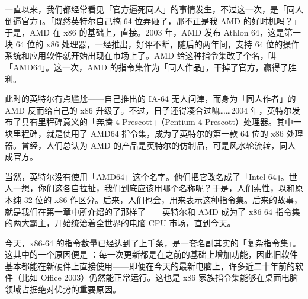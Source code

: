一直以来，我们都经常看见「官方逼死同人」的事情发生，不过这一次，是「同人倒逼官方」。「既然英特尔自己搞 64 位弄砸了，那不正是我 AMD 的好时机吗？」于是，AMD 在 x86 的基础上，直接。2003 年，AMD 发布 Athlon 64，这是第一块 64 位的 x86 处理器，一经推出，好评不断，随后的两年间，支持 64 位的操作系统和应用软件就开始出现在市场上了。AMD 给这种指令集改了个名，叫「AMD64」。这一次，AMD 的指令集作为「同人作品」，干掉了官方，赢得了胜利。

此时的英特尔有点尴尬——自己推出的 IA-64 无人问津，而身为「同人作者」的 AMD 反而给自己的 x86 升级了。不过，日子还得凑合过嘛……2004 年，英特尔发布了具有里程碑意义的「奔腾 4 Prescott」（Pentium 4 Prescott）处理器。其中一块里程碑，就是使用了 AMD64 指令集，成为了英特尔的第一款 64 位的 x86 处理器。曾经，人们总认为 AMD 的产品是英特尔的仿制品，可是风水轮流转，同人成官方。

当然，英特尔没有使用「AMD64」这个名字。他们把它改名成了「Intel 64」。世人一想，你们这各自拉扯，我们到底应该用哪个名称呢？于是，人们索性，以和原本纯 32 位的 x86 作区分。后来，人们也会，用来表示这种指令集。后来的故事，就是我们在第一章中所介绍的了那样了——英特尔和 AMD 成为了 x86-64 指令集的两大霸主，开始统治着全世界的电脑 CPU 市场，直到今天。

今天，x86-64 的指令数量已经达到了上千条，是一套名副其实的「复杂指令集」。这其中的一个原因便是 ：每一次更新都是在之前的基础上增加功能，因此旧软件基本都能在新硬件上直接使用——即便在今天的最新电脑上，许多近二十年前的软件（比如 Office 2003）仍然能正常运行。这也是 x86 家族指令集能够在桌面电脑领域占据绝对优势的重要原因。

